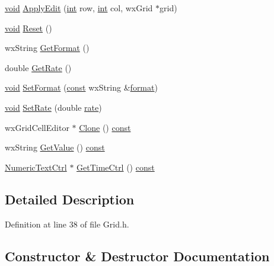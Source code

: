 \begin{DoxyCompactItemize}
\item 
\hyperlink{sound_8c_ae35f5844602719cf66324f4de2a658b3}{void} \hyperlink{class_time_editor_a2afd18edfb4d7a686820915d35044136}{Apply\+Edit} (\hyperlink{xmltok_8h_a5a0d4a5641ce434f1d23533f2b2e6653}{int} row, \hyperlink{xmltok_8h_a5a0d4a5641ce434f1d23533f2b2e6653}{int} col, wx\+Grid $\ast$grid)
\item 
\hyperlink{sound_8c_ae35f5844602719cf66324f4de2a658b3}{void} \hyperlink{class_time_editor_a242b6c25e7912b1abcb9587541dab825}{Reset} ()
\item 
wx\+String \hyperlink{class_time_editor_a01f23a79007acd603f3f17d10263daad}{Get\+Format} ()
\item 
double \hyperlink{class_time_editor_a932b6871e049dcfe55d044052824cdcd}{Get\+Rate} ()
\item 
\hyperlink{sound_8c_ae35f5844602719cf66324f4de2a658b3}{void} \hyperlink{class_time_editor_aa1f30ba44cdca9755e5febac9a5519f3}{Set\+Format} (\hyperlink{getopt1_8c_a2c212835823e3c54a8ab6d95c652660e}{const} wx\+String \&\hyperlink{_export_p_c_m_8cpp_a317afff57d87a89158c2b038d37b2b08}{format})
\item 
\hyperlink{sound_8c_ae35f5844602719cf66324f4de2a658b3}{void} \hyperlink{class_time_editor_a244ddcb10db71d06a2811d305f1d1cbf}{Set\+Rate} (double \hyperlink{seqread_8c_ad89d3fac2deab7a9cf6cfc8d15341b85}{rate})
\item 
wx\+Grid\+Cell\+Editor $\ast$ \hyperlink{class_time_editor_abd9baf7d488d990d3fc09d92347c8720}{Clone} () \hyperlink{getopt1_8c_a2c212835823e3c54a8ab6d95c652660e}{const} 
\item 
wx\+String \hyperlink{class_time_editor_a9993e74a462f074082504c31edc6aa24}{Get\+Value} () \hyperlink{getopt1_8c_a2c212835823e3c54a8ab6d95c652660e}{const} 
\item 
\hyperlink{class_numeric_text_ctrl}{Numeric\+Text\+Ctrl} $\ast$ \hyperlink{class_time_editor_aa9c6de8e3b4b1e8811327d9c10535cc1}{Get\+Time\+Ctrl} () \hyperlink{getopt1_8c_a2c212835823e3c54a8ab6d95c652660e}{const} 
\end{DoxyCompactItemize}


\subsection{Detailed Description}


Definition at line 38 of file Grid.\+h.



\subsection{Constructor \& Destructor Documentation}
